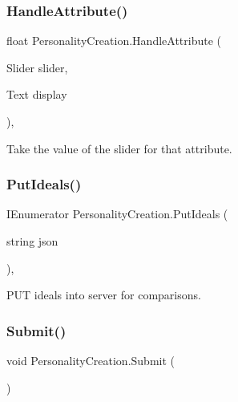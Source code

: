 \subsubsection{\texorpdfstring{HandleAttribute()}{HandleAttribute()}}
{\footnotesize\ttfamily float Personality\+Creation.\+Handle\+Attribute (\begin{DoxyParamCaption}\item[{Slider}]{slider,  }\item[{Text}]{display }\end{DoxyParamCaption})\hspace{0.3cm}{\ttfamily [inline]}, {\ttfamily [private]}}



Take the value of the slider for that attribute. 

\mbox{\label{class_personality_creation_aa8e27efd53fd6cbc698c84a863fbcafa}} 
\subsubsection{\texorpdfstring{PutIdeals()}{PutIdeals()}}
{\footnotesize\ttfamily I\+Enumerator Personality\+Creation.\+Put\+Ideals (\begin{DoxyParamCaption}\item[{string}]{json }\end{DoxyParamCaption})\hspace{0.3cm}{\ttfamily [inline]}, {\ttfamily [private]}}



P\+UT ideals into server for comparisons. 

\mbox{\label{class_personality_creation_a464be274e82be75bab0899f8756c9562}} 
\subsubsection{\texorpdfstring{Submit()}{Submit()}}
{\footnotesize\ttfamily void Personality\+Creation.\+Submit (\begin{DoxyParamCaption}{ }\end{DoxyParamCaption})\hspace{0.3cm}{\ttfamily [inline]}}



